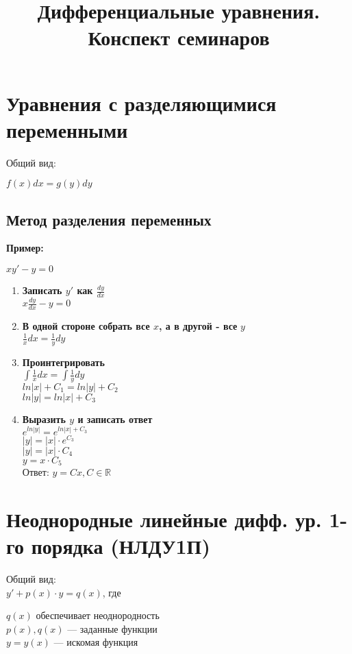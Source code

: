 \documentclass[10pt, letter]{book}
\title{Дифференциальные уравнения. Конспект семинаров}
\date{}
\begin{document}
\maketitle

\section{Уравнения с разделяющимися переменными}
Общий вид: \\
\par $f(x)dx = g(y)dy$

\subsection{Метод разделения переменных}
\textbf{Пример:}
\par $xy' - y = 0$
\begin{enumerate}
    \item \textbf{Записать $y'$ как $\frac{dy}{dx}$} \\
        $x\frac{dy}{dx} - y = 0$ 
    \item \textbf{В одной стороне собрать все $x$, а в другой - все} $y$ \\
        $\frac{1}{x}dx = \frac{1}{y}dy$
    \item \textbf{Проинтегрировать} \\
        $\int\frac{1}{x}dx = \int\frac{1}{y}dy$ \\
        $ln|x| + C_{1} = ln|y| + C_{2}$ \\
        $ln|y| = ln|x| + C_{3}$
    \item \textbf{Выразить $y$ и записать ответ} \\
        $e^{ln|y|} = e^{ln|x| + C_{3}}$ \\
        $|y| = |x| · e^{C_{3}}$ \\
        $|y| = |x| · C_{4}$ \\
        $y = x · C_{5}$ \\
        Ответ: $y = Cx, C \in \mathbb{R}$
\end{enumerate}

\section{Неоднородные линейные дифф. ур. 1-го порядка (НЛДУ1П)}
Общий вид: \\
$y' + p(x)·y = q(x)$, где \\
\begin{tabbing}
    $q(x)$ обеспечивает неоднородность \\
    $p(x), q(x)$ — заданные функции \\
    $y = y(x)$ — искомая функция
\end{tabbing}
\end{document}
